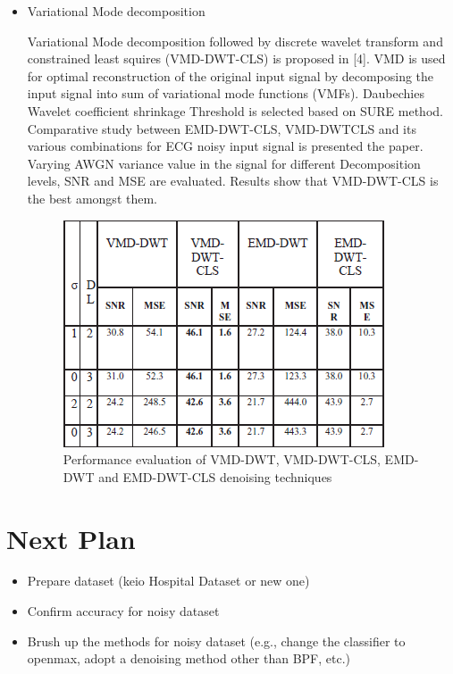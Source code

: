\documentclass[dvipdfmx]{article}
\begin{document}
\begin{itemize}
    \item Variational Mode decomposition

    Variational Mode decomposition followed by discrete wavelet transform and constrained least squires (VMD-DWT-CLS) is proposed in [4].
    VMD is used for optimal reconstruction of the original input signal by decomposing the input signal into sum of variational mode functions (VMFs). Daubechies Wavelet coefficient shrinkage Threshold is selected based on SURE method. Comparative study between EMD-DWT-CLS, VMD-DWTCLS and its various combinations for ECG noisy input signal is presented the paper. Varying AWGN variance value in the signal for different Decomposition levels, SNR and MSE are evaluated. Results show that VMD-DWT-CLS is the best amongst them.

    \begin{figure}[H]
    \begin{center}
    \includegraphics[width=0.85\linewidth]{"./img/VMD_comp.png"}
    \end{center}
    \caption{Performance evaluation of VMD-DWT, VMD-DWT-CLS, EMD-DWT and EMD-DWT-CLS denoising techniques}
    \end{figure}
\end{itemize}

\section{Next Plan}
\begin{itemize}
    \item Prepare dataset (keio Hospital Dataset or new one)
    \item Confirm accuracy for noisy dataset
    \item Brush up the methods for noisy dataset (e.g., change the classifier to openmax, adopt a denoising method other than BPF, etc.)
\end{itemize}
\end{document}

